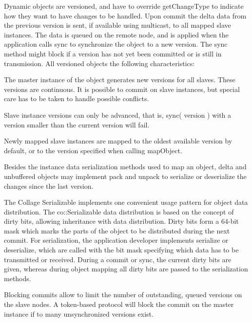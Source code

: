 \documentclass[10pt,journal,compsoc]{IEEEtran}
\begin{document}
Dynamic objects are versioned, and have to override \textsf{getChangeType} to
indicate how they want to have changes to be handled. Upon \textsf{commit} the
delta data from the previous version is sent, if available using multicast, to
all mapped slave instances. The data is queued on the remote node, and is
applied when the application calls \textsf{sync} to synchronize the object to a
new version. The \textsf{sync} method might block if a version has not yet been
committed or is still in transmission. All versioned objects the following
characteristics:

\begin{compactitem}
\item The master instance of the object generates new versions for all
  slaves. These versions are continuous. It is possible to commit on slave
  instances, but special care has to be taken to handle possible
  conflicts.
\item Slave instance versions can only be advanced, that is, \textsf{sync(
  version )} with a version smaller than the current version will fail.
\item Newly mapped slave instances are mapped to the oldest available
  version by default, or to the version specified when calling
  \textsf{mapObject}.
\end{compactitem}

Besides the instance data serialization methods used to map an object, delta and
unbuffered objects may implement \textsf{pack} and \textsf{unpack} to serialize
or deserialize the changes since the last version.

\label{sec:Serializable}The Collage Serializable implements one convenient usage
pattern for object data distribution. The \textsf{co::Serializable} data
distribution is based on the concept of dirty bits, allowing inheritance with
data distribution. Dirty bits form a 64-bit mask which marks the parts of the
object to be distributed during the next commit. For serialization, the
application developer implements \textsf{serialize} or \textsf{deserialize},
which are called with the bit mask specifying which data has to be transmitted
or received. During a commit or sync, the current dirty bits are given, whereas
during object mapping all dirty bits are passed to the serialization methods.

Blocking commits allow to limit the number of outstanding, queued versions on
the slave nodes. A token-based protocol will block the commit on the master
instance if to many unsynchronized versions exist.
\end{document}
